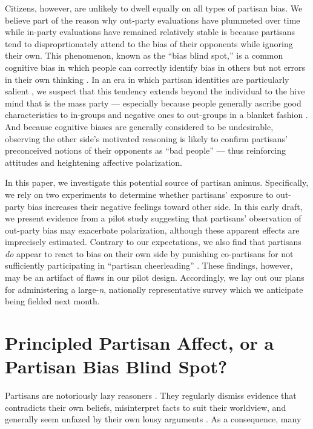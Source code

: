 \documentclass[12pt, letterpaper]{article}
\begin{document}
Citizens, however, are unlikely to dwell equally on all types of partisan bias. We believe part of the reason why out-party evaluations have plummeted over time while in-party evaluations have remained relatively stable \citep{IyengarSoodLelkes2012,Hetherington2009} is because partisans tend to disproprtionately attend to the bias of their opponents while ignoring their own. This phenomenon, known as the ``bias blind spot,'' is a common cognitive bias in which people can correctly identify bias in others but not errors in their own thinking \citep{proninetal_2002,pronin_2007}. In an era in which partisan identities are particularly salient \citep{bartels2000,Hetherington2001}, we suspect that this tendency extends beyond the individual to the hive mind that is the mass party --- especially because people generally ascribe good characteristics to in-groups and negative ones to out-groups in a blanket fashion \citep{alexander1999images}. And because cognitive biases are generally considered to be undesirable, observing the other side's motivated reasoning is likely to confirm partisans' preconceived notions of their opponents as ``bad people'' --- thus reinforcing attitudes and heightening affective polarization. 

In this paper, we investigate this potential source of partisan animus. Specifically, we rely on two experiments to determine whether partisans' exposure to out-party bias increases their negative feelings toward other side. In this early draft, we present evidence from a pilot study suggesting that partisans' observation of out-party bias may exacerbate polarization, although these apparent effects are imprecisely estimated. Contrary to our expectations, we also find that partisans \textit{do} appear to react to bias on their own side by punishing co-partisans for not sufficiently participating in ``partisan cheerleading'' \citep{bullocketal_2015}. These findings, however, may be an artifact of flaws in our pilot design. Accordingly, we lay out our plans for administering a large-\textit{n}, nationally representative survey which we anticipate being fielded next month. %

\section*{Principled Partisan Affect, or a Partisan Bias Blind Spot?}

Partisans are notoriously lazy reasoners \citep{lodgetaber_2013}. They regularly dismiss evidence that contradicts their own beliefs, misinterpret facts to suit their worldview, and generally seem unfazed by their own lousy arguments \citep{bartels_2002,druckmanetal_2013,gainesetal_2007,taber2006}. As a consequence, many  
\end{document}

